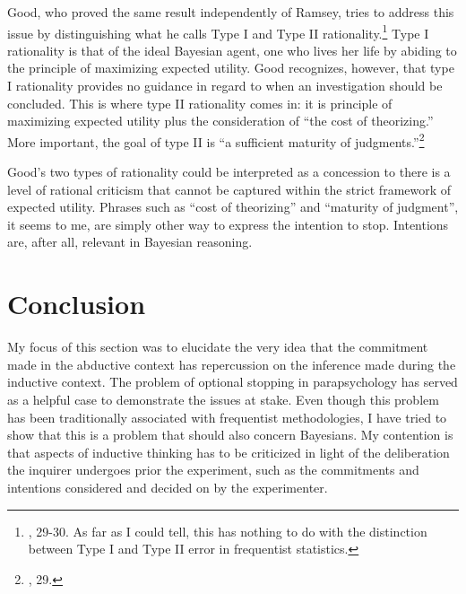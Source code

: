 Good, who proved the same result independently of Ramsey, tries to
address this issue by distinguishing what he calls Type I and Type II
rationality.\footnote{\cite{goodthinking}, 29-30. As far as I
  could tell, this has nothing to do with the distinction between Type I
  and Type II error in frequentist statistics.} Type I rationality is
that of the ideal Bayesian agent, one who lives her life by abiding to
the principle of maximizing expected utility. Good recognizes, however,
that type I rationality provides no guidance in regard to when an
investigation should be concluded. This is where type II rationality
comes in: it is principle of maximizing expected utility plus the
consideration of ``the cost of theorizing.'' More important, the goal of
type II is ``a sufficient maturity of judgments.''\footnote{\cite{goodthinking}, 29.}

Good's two types of rationality could be interpreted as a concession to
there is a level of rational criticism that cannot be captured within
the strict framework of expected utility. Phrases such as ``cost of
theorizing'' and ``maturity of judgment'', it seems to me, are simply
other way to express the intention to stop. Intentions are, after all,
relevant in Bayesian reasoning.

\section{Conclusion}\label{stoppingcon}

My focus of this section was to elucidate the very idea that the commitment made in the abductive context has  repercussion on the inference made during the inductive context. The problem of optional stopping in parapsychology has served as a helpful case to demonstrate the issues at stake. Even though this problem has been traditionally associated with frequentist methodologies, I have tried to show that this is a problem that should also concern Bayesians. My contention is that aspects of inductive thinking has to be criticized in light of the deliberation the inquirer undergoes prior the experiment, such as the commitments and intentions considered and decided on by the experimenter. 

 